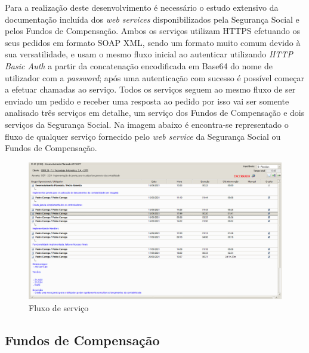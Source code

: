 \documentclass[sigplan]{acmart}
\begin{document}
Para a realização deste desenvolvimento é necessário o estudo extensivo da documentação incluída dos \textit{web services} disponibilizados pela Segurança Social e pelos Fundos de Compensação. Ambos os serviços utilizam HTTPS efetuando os seus pedidos em formato SOAP XML, sendo um formato muito comum devido à sua versatilidade, e usam o mesmo fluxo inicial ao autenticar utilizando \textit{HTTP Basic Auth} a partir da concatenação encodificada em Base64 do nome de utilizador com a \textit{password}; após uma autenticação com sucesso é possível começar a efetuar chamadas ao serviço. Todos os serviços seguem ao mesmo fluxo de ser enviado um pedido e receber uma resposta ao pedido por isso vai ser somente analisado três serviços em detalhe, um serviço dos Fundos de Compensação e dois serviços da Segurança Social. Na imagem abaixo é encontra-se representado o fluxo de qualquer serviço fornecido pelo \textit{web service} da Segurança Social ou Fundos de Compensação.
\begin{figure}[htbp] %
	\centerline{\includegraphics[width=\linewidth]{figures/evento_formacao.png}}
	\caption{Fluxo de serviço}
	\label{fig3}
\end{figure}


\subsection{Fundos de Compensação}
\end{document}
